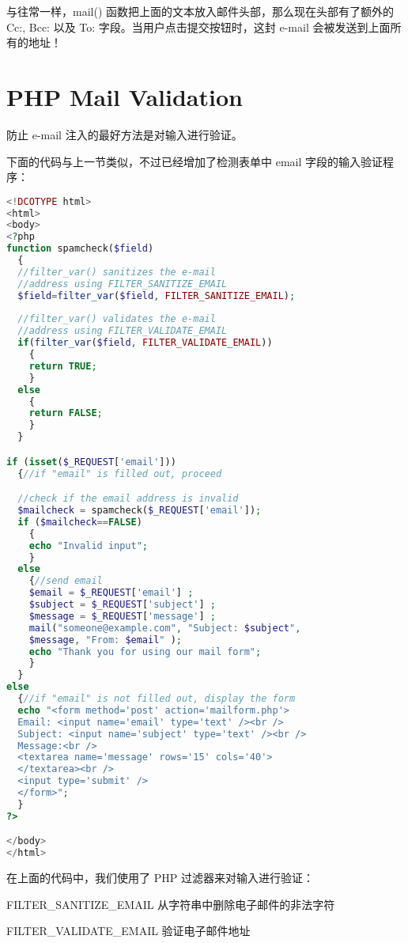 与往常一样，mail() 函数把上面的文本放入邮件头部，那么现在头部有了额外的 Cc:, Bcc: 以及 To: 字段。当用户点击提交按钮时，这封 e-mail 会被发送到上面所有的地址！


\section{PHP Mail Validation}


防止 e-mail 注入的最好方法是对输入进行验证。


下面的代码与上一节类似，不过已经增加了检测表单中 email 字段的输入验证程序：

\begin{lstlisting}[language=PHP]
<!DCOTYPE html>
<html>
<body>
<?php
function spamcheck($field)
  {
  //filter_var() sanitizes the e-mail 
  //address using FILTER_SANITIZE_EMAIL
  $field=filter_var($field, FILTER_SANITIZE_EMAIL);
  
  //filter_var() validates the e-mail
  //address using FILTER_VALIDATE_EMAIL
  if(filter_var($field, FILTER_VALIDATE_EMAIL))
    {
    return TRUE;
    }
  else
    {
    return FALSE;
    }
  }

if (isset($_REQUEST['email']))
  {//if "email" is filled out, proceed

  //check if the email address is invalid
  $mailcheck = spamcheck($_REQUEST['email']);
  if ($mailcheck==FALSE)
    {
    echo "Invalid input";
    }
  else
    {//send email
    $email = $_REQUEST['email'] ; 
    $subject = $_REQUEST['subject'] ;
    $message = $_REQUEST['message'] ;
    mail("someone@example.com", "Subject: $subject",
    $message, "From: $email" );
    echo "Thank you for using our mail form";
    }
  }
else
  {//if "email" is not filled out, display the form
  echo "<form method='post' action='mailform.php'>
  Email: <input name='email' type='text' /><br />
  Subject: <input name='subject' type='text' /><br />
  Message:<br />
  <textarea name='message' rows='15' cols='40'>
  </textarea><br />
  <input type='submit' />
  </form>";
  }
?>

</body>
</html>
\end{lstlisting}

在上面的代码中，我们使用了 PHP 过滤器来对输入进行验证：

\begin{compactitem}
\item FILTER\_SANITIZE\_EMAIL 从字符串中删除电子邮件的非法字符
\item FILTER\_VALIDATE\_EMAIL 验证电子邮件地址
\end{compactitem}






